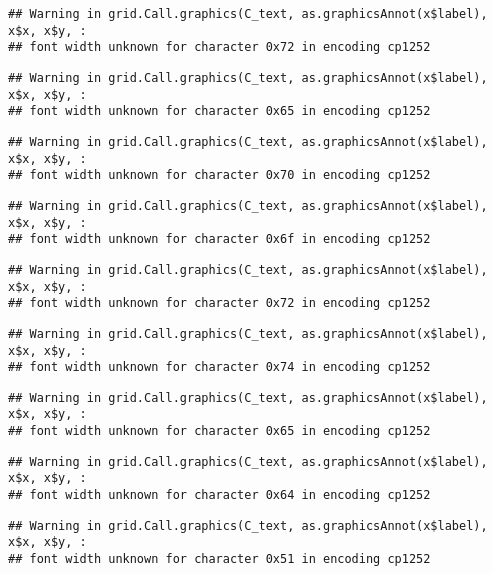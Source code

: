 \documentclass[
]{article}
\begin{document}
\begin{verbatim}
## Warning in grid.Call.graphics(C_text, as.graphicsAnnot(x$label), x$x, x$y, :
## font width unknown for character 0x72 in encoding cp1252
\end{verbatim}

\begin{verbatim}
## Warning in grid.Call.graphics(C_text, as.graphicsAnnot(x$label), x$x, x$y, :
## font width unknown for character 0x65 in encoding cp1252
\end{verbatim}

\begin{verbatim}
## Warning in grid.Call.graphics(C_text, as.graphicsAnnot(x$label), x$x, x$y, :
## font width unknown for character 0x70 in encoding cp1252
\end{verbatim}

\begin{verbatim}
## Warning in grid.Call.graphics(C_text, as.graphicsAnnot(x$label), x$x, x$y, :
## font width unknown for character 0x6f in encoding cp1252
\end{verbatim}

\begin{verbatim}
## Warning in grid.Call.graphics(C_text, as.graphicsAnnot(x$label), x$x, x$y, :
## font width unknown for character 0x72 in encoding cp1252
\end{verbatim}

\begin{verbatim}
## Warning in grid.Call.graphics(C_text, as.graphicsAnnot(x$label), x$x, x$y, :
## font width unknown for character 0x74 in encoding cp1252
\end{verbatim}

\begin{verbatim}
## Warning in grid.Call.graphics(C_text, as.graphicsAnnot(x$label), x$x, x$y, :
## font width unknown for character 0x65 in encoding cp1252
\end{verbatim}

\begin{verbatim}
## Warning in grid.Call.graphics(C_text, as.graphicsAnnot(x$label), x$x, x$y, :
## font width unknown for character 0x64 in encoding cp1252
\end{verbatim}

\begin{verbatim}
## Warning in grid.Call.graphics(C_text, as.graphicsAnnot(x$label), x$x, x$y, :
## font width unknown for character 0x51 in encoding cp1252
\end{verbatim}
\end{document}
